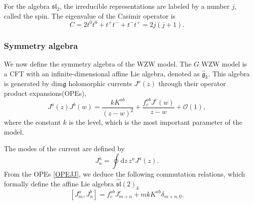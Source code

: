 \documentclass[10pt,a4paper]{article}
\numberwithin{equation}{section}
\begin{document}
For the algebra $\mathfrak{sl}_{2}$, the irreducible representations are labeled by a number $j$, called the spin. 
The eigenvalue of the Casimir operator is 
\begin{equation}
    C = 2 t^{0} t^{0} + t^{+} t^{-} + t^{-} t^{+} = 2j(j+1).
\end{equation}

\subsubsection*{Symmetry algebra}
We now define the symmetry algebra of the WZW model. 
The $G$ WZW model is a CFT with an infinite-dimensional affine Lie algebra, denoted as $\hat{\mathfrak{g}}_{k}$. 
This algebra is generated by dim$\mathfrak{g}$ holomorphic currents $J^{a}(z)$ through their operator product expansions(OPEs), 
\begin{equation}
    \boxed{
        J^{a}(z)J^{b}(w) = \frac{kK^{ab}}{(z-w)^{2}} + \frac{f^{ab}_{c} J^{c}(w)}{z-w} + \mathcal{O}(1), \label{OPEJJ}
        }
\end{equation}
where the constant $k$ is the level, which is the most important parameter of the model. 

The modes of the current are defined by 
\begin{equation}
    J^{a}_{n} = \oint \mathrm{d}z \, z^{n} J^{a}(z).
\end{equation}
From the OPEs \eqref{OPEJJ}, we deduce the following commutation relations, 
which formally define the affine Lie algebra $\widehat{\mathfrak{sl}}(2)_{k}$
\begin{equation}
    \boxed{
        \left[ J^{a}_{m}, J^{b}_{n} \right] = f^{ab}_{c} J^{c}_{m+n} + m k K^{ab} \delta_{m+n,0}. \label{CR1}
    }
\end{equation}
\end{document}
